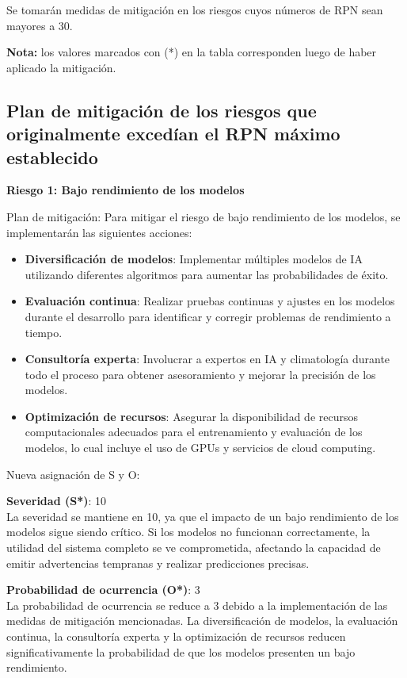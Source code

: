 \documentclass[
11pt, %
codirector, %
]{charter}
\begin{document}
Se tomarán medidas de mitigación en los riesgos cuyos números de RPN sean mayores a 30.

\textbf{Nota:} los valores marcados con (*) en la tabla corresponden luego de haber aplicado la mitigación.

\subsection{Plan de mitigación de los riesgos que originalmente excedían el RPN máximo establecido}

\textbf{Riesgo 1: Bajo rendimiento de los modelos}

Plan de mitigación:
Para mitigar el riesgo de bajo rendimiento de los modelos, se implementarán las siguientes acciones:
\begin{itemize}
    \item \textbf{Diversificación de modelos}: Implementar múltiples modelos de IA utilizando diferentes algoritmos para aumentar las probabilidades de éxito.
    \item \textbf{Evaluación continua}: Realizar pruebas continuas y ajustes en los modelos durante el desarrollo para identificar y corregir problemas de rendimiento a tiempo.
    \item \textbf{Consultoría experta}: Involucrar a expertos en IA y climatología durante todo el proceso para obtener asesoramiento y mejorar la precisión de los modelos.
    \item \textbf{Optimización de recursos}: Asegurar la disponibilidad de recursos computacionales adecuados para el entrenamiento y evaluación de los modelos, lo cual incluye el uso de GPUs y servicios de cloud computing.
\end{itemize}

Nueva asignación de S y O:

\textbf{Severidad (S*)}: 10\\
La severidad se mantiene en 10, ya que el impacto de un bajo rendimiento de los modelos sigue siendo crítico. Si los modelos no funcionan correctamente, la utilidad del sistema completo se ve comprometida, afectando la capacidad de emitir advertencias tempranas y realizar predicciones precisas.

\textbf{Probabilidad de ocurrencia (O*)}: 3\\
La probabilidad de ocurrencia se reduce a 3 debido a la implementación de las medidas de mitigación mencionadas. La diversificación de modelos, la evaluación continua, la consultoría experta y la optimización de recursos reducen significativamente la probabilidad de que los modelos presenten un bajo rendimiento.
\end{document}

